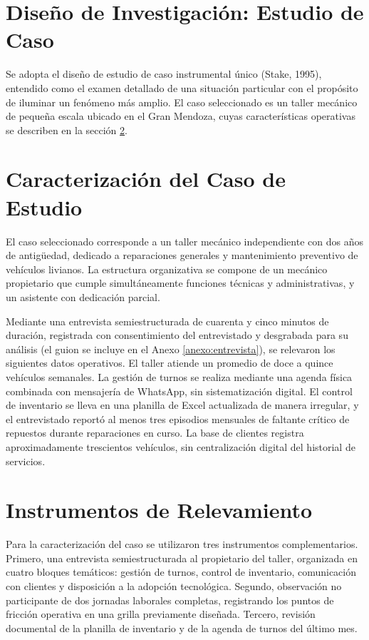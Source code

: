 \documentclass[12pt,a4paper]{report}
\begin{document}
\section{Diseño de Investigación: Estudio de Caso}

Se adopta el diseño de estudio de caso instrumental único (Stake, 1995), entendido como el examen detallado de una situación particular con el propósito de iluminar un fenómeno más amplio. El caso seleccionado es un taller mecánico de pequeña escala ubicado en el Gran Mendoza, cuyas características operativas se describen en la sección \ref{sec:caracterizacion}.

\section{Caracterización del Caso de Estudio}
\label{sec:caracterizacion}

El caso seleccionado corresponde a un taller mecánico independiente con dos años de antigüedad, dedicado a reparaciones generales y mantenimiento preventivo de vehículos livianos. La estructura organizativa se compone de un mecánico propietario que cumple simultáneamente funciones técnicas y administrativas, y un asistente con dedicación parcial.

Mediante una entrevista semiestructurada de cuarenta y cinco minutos de duración, registrada con consentimiento del entrevistado y desgrabada para su análisis (el guion se incluye en el Anexo \ref{anexo:entrevista}), se relevaron los siguientes datos operativos. El taller atiende un promedio de doce a quince vehículos semanales. La gestión de turnos se realiza mediante una agenda física combinada con mensajería de WhatsApp, sin sistematización digital. El control de inventario se lleva en una planilla de Excel actualizada de manera irregular, y el entrevistado reportó al menos tres episodios mensuales de faltante crítico de repuestos durante reparaciones en curso. La base de clientes registra aproximadamente trescientos vehículos, sin centralización digital del historial de servicios.

\section{Instrumentos de Relevamiento}

Para la caracterización del caso se utilizaron tres instrumentos complementarios. Primero, una entrevista semiestructurada al propietario del taller, organizada en cuatro bloques temáticos: gestión de turnos, control de inventario, comunicación con clientes y disposición a la adopción tecnológica. Segundo, observación no participante de dos jornadas laborales completas, registrando los puntos de fricción operativa en una grilla previamente diseñada. Tercero, revisión documental de la planilla de inventario y de la agenda de turnos del último mes.
\end{document}
